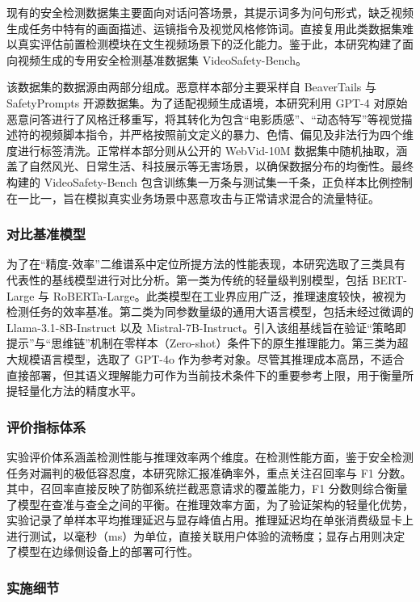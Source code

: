 现有的安全检测数据集主要面向对话问答场景，其提示词多为问句形式，缺乏视频生成任务中特有的画面描述、运镜指令及视觉风格修饰词。直接复用此类数据集难以真实评估前置检测模块在文生视频场景下的泛化能力。鉴于此，本研究构建了面向视频生成的专用安全检测基准数据集 VideoSafety-Bench。

该数据集的数据源由两部分组成。恶意样本部分主要采样自 BeaverTails 与 SafetyPrompts 开源数据集。为了适配视频生成语境，本研究利用 GPT-4 对原始恶意问答进行了风格迁移重写，将其转化为包含“电影质感”、“动态特写”等视觉描述符的视频脚本指令，并严格按照前文定义的暴力、色情、偏见及非法行为四个维度进行标签清洗。正常样本部分则从公开的 WebVid-10M 数据集中随机抽取，涵盖了自然风光、日常生活、科技展示等无害场景，以确保数据分布的均衡性。最终构建的 VideoSafety-Bench 包含训练集一万条与测试集一千条，正负样本比例控制在一比一，旨在模拟真实业务场景中恶意攻击与正常请求混合的流量特征。

\subsubsection{对比基准模型}

为了在“精度-效率”二维谱系中定位所提方法的性能表现，本研究选取了三类具有代表性的基线模型进行对比分析。第一类为传统的轻量级判别模型，包括 BERT-Large 与 RoBERTa-Large。此类模型在工业界应用广泛，推理速度较快，被视为检测任务的效率基准。第二类为同参数量级的通用大语言模型，包括未经过微调的 Llama-3.1-8B-Instruct 以及 Mistral-7B-Instruct。引入该组基线旨在验证“策略即提示”与“思维链”机制在零样本（Zero-shot）条件下的原生推理能力。第三类为超大规模语言模型，选取了 GPT-4o 作为参考对象。尽管其推理成本高昂，不适合直接部署，但其语义理解能力可作为当前技术条件下的重要参考上限，用于衡量所提轻量化方法的精度水平。

\subsubsection{评价指标体系}

实验评价体系涵盖检测性能与推理效率两个维度。在检测性能方面，鉴于安全检测任务对漏判的极低容忍度，本研究除汇报准确率外，重点关注召回率与 F1 分数。其中，召回率直接反映了防御系统拦截恶意请求的覆盖能力，F1 分数则综合衡量了模型在查准与查全之间的平衡。在推理效率方面，为了验证架构的轻量化优势，实验记录了单样本平均推理延迟与显存峰值占用。推理延迟均在单张消费级显卡上进行测试，以毫秒（ms）为单位，直接关联用户体验的流畅度；显存占用则决定了模型在边缘侧设备上的部署可行性。

\subsubsection{实施细节}

